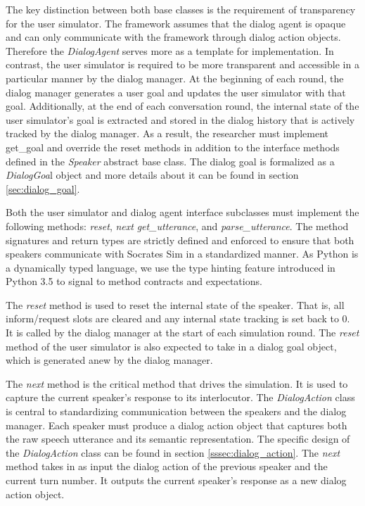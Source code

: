 The key distinction between both base classes is the requirement of transparency for the user simulator. The framework assumes that the dialog agent is opaque and can only communicate with the framework through dialog action objects. Therefore the \textit{DialogAgent} serves more as a template for implementation.  In contrast, the user simulator is required to be more transparent and accessible in a particular manner by the dialog manager. At the beginning of each round, the dialog manager generates a user goal and updates the user simulator with that goal. Additionally, at the end of each conversation round, the internal state of the user simulator's goal is extracted and stored in the dialog history that is actively tracked by the dialog manager. As a result, the researcher must implement get\_goal and override the reset methods in addition to the interface methods defined in the \textit{Speaker} abstract base class. The dialog goal is formalized as a \textit{DialogGoa}l object and more details about it can be found in section \ref{sec:dialog_goal}. 

Both the user simulator and dialog agent interface subclasses must implement the following methods: \textit{reset}, \textit{next} \textit{get\_utterance}, and \textit{parse\_utterance}. The method signatures and return types are strictly defined and enforced to ensure that both speakers communicate with Socrates Sim in a standardized manner. As Python is a dynamically typed language, we use the type hinting feature introduced in Python 3.5 to signal to method contracts and expectations. 

The \textit{reset} method is used to reset the internal state of the speaker. That is, all inform/request slots are cleared and any internal state tracking is set back to 0. It is called by the dialog manager at the start of each simulation round. The \textit{reset} method of the user simulator is also expected to take in a dialog goal object, which is generated anew by the dialog manager. 

The \textit{next} method is the critical method that drives the simulation. It is used to capture the current speaker's response to its interlocutor. The \textit{DialogAction} class is central to standardizing communication between the speakers and the dialog manager. Each speaker must produce a dialog action object that captures both the raw speech utterance and its semantic representation. The specific design of the \textit{DialogAction} class can be found in section \ref{sssec:dialog_action}. The \textit{next} method takes in as input the dialog action of the previous speaker and the current turn number. It outputs the current speaker's response as a new dialog action object.

